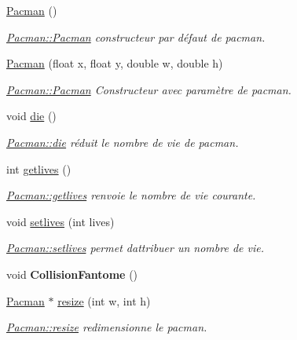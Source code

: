 \begin{DoxyCompactItemize}
\item 
\hypertarget{class_pacman_a499408baab38f119ebd4f41e90fbe3fe}{}\hyperlink{class_pacman_a499408baab38f119ebd4f41e90fbe3fe}{Pacman} ()\label{class_pacman_a499408baab38f119ebd4f41e90fbe3fe}

\begin{DoxyCompactList}\small\item\em \hyperlink{class_pacman_a499408baab38f119ebd4f41e90fbe3fe}{Pacman\+::\+Pacman} constructeur par défaut de pacman. \end{DoxyCompactList}\item 
\hyperlink{class_pacman_a459aba0fb8132acea8d96cd391b3e007}{Pacman} (float x, float y, double w, double h)
\begin{DoxyCompactList}\small\item\em \hyperlink{class_pacman_a499408baab38f119ebd4f41e90fbe3fe}{Pacman\+::\+Pacman} Constructeur avec paramètre de pacman. \end{DoxyCompactList}\item 
\hypertarget{class_pacman_a880f3f899b2f2d1ee9969fa049f7289d}{}void \hyperlink{class_pacman_a880f3f899b2f2d1ee9969fa049f7289d}{die} ()\label{class_pacman_a880f3f899b2f2d1ee9969fa049f7289d}

\begin{DoxyCompactList}\small\item\em \hyperlink{class_pacman_a880f3f899b2f2d1ee9969fa049f7289d}{Pacman\+::die} réduit le nombre de vie de pacman. \end{DoxyCompactList}\item 
int \hyperlink{class_pacman_a9866de257a7fc67f56fee117ecff3060}{getlives} ()
\begin{DoxyCompactList}\small\item\em \hyperlink{class_pacman_a9866de257a7fc67f56fee117ecff3060}{Pacman\+::getlives} renvoie le nombre de vie courante. \end{DoxyCompactList}\item 
void \hyperlink{class_pacman_ac2b56b7581f999fb374ef04f8d8ac9a4}{setlives} (int lives)
\begin{DoxyCompactList}\small\item\em \hyperlink{class_pacman_ac2b56b7581f999fb374ef04f8d8ac9a4}{Pacman\+::setlives} permet d\textquotesingle{}attribuer un nombre de vie. \end{DoxyCompactList}\item 
\hypertarget{class_pacman_a5945a47618f294f298dfda06c4ef1094}{}void {\bfseries Collision\+Fantome} ()\label{class_pacman_a5945a47618f294f298dfda06c4ef1094}

\item 
\hyperlink{class_pacman}{Pacman} $\ast$ \hyperlink{class_pacman_adc9142f8bd016165ddd5ed42ab34f54f}{resize} (int w, int h)
\begin{DoxyCompactList}\small\item\em \hyperlink{class_pacman_adc9142f8bd016165ddd5ed42ab34f54f}{Pacman\+::resize} redimensionne le pacman. \end{DoxyCompactList}\end{DoxyCompactItemize}
